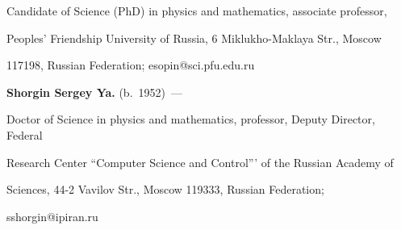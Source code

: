 Candidate of Science (PhD) in physics and mathematics, associate professor, 

Peoples' Friendship University of Russia, 6 Miklukho-Maklaya Str., Moscow 

117198, Russian Federation; esopin@sci.pfu.edu.ru



\vspace*{3pt}



\noindent

\textbf{Shorgin Sergey Ya.} (b.\ 1952)~---

Doctor of Science in physics and mathematics, professor, Deputy Director, Federal 

Research Center ``Computer Science and Control''' of the Russian Academy of 

Sciences, 44-2 Vavilov Str., Moscow 119333, Russian Federation; 

sshorgin@ipiran.ru



\label{end\stat}





\renewcommand{\bibname}{\protect\rm Литература}

